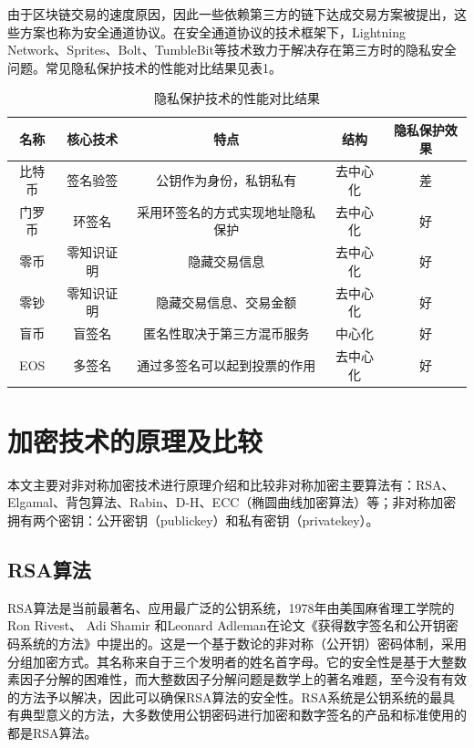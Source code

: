 \documentclass[UTF8,a4paper,10pt, twocolumn]{ctexart}
\begin{document}
由于区块链交易的速度原因，因此一些依赖第三方的链下达成交易方案被提出，这些方案也称为安全通道协议。在安全通道协议的技术框架下，Lightning Network、Sprites、Bolt、TumbleBit等技术致力于解决存在第三方时的隐私安全问题。常见隐私保护技术的性能对比结果见表1。

\begin{table}[hb]
	\caption{隐私保护技术的性能对比结果} \label{tab:table}
	\centering
	\addtolength{\tabcolsep}{-0mm} %
	\begin{tabular}{ccccc}
		\toprule[0.75pt]	%
		名称 & 核心技术 & 特点 & 结构 & 隐私保护效果 \\
		\midrule[0.5pt]	%
		比特币 & 签名验签 & 公钥作为身份，私钥私有 & 去中心化 & 差 \\  %
		门罗币 & 环签名 & 采用环签名的方式实现地址隐私保护 & 去中心化 & 好 \\
		零币 & 零知识证明 & 隐藏交易信息 & 去中心化 & 好 \\
		零钞 & 零知识证明 & 隐藏交易信息、交易金额 & 去中心化 & 好 \\
		盲币 & 盲签名 & 匿名性取决于第三方混币服务 & 中心化 & 好 \\
		EOS & 多签名 & 通过多签名可以起到投票的作用 & 去中心化 & 好 \\
		\bottomrule[0.75pt]	%
	\end{tabular}
\end{table}

\section{加密技术的原理及比较} \label{sec:two}
本文主要对非对称加密技术进行原理介绍和比较非对称加密主要算法有：RSA、Elgamal、背包算法、Rabin、D-H、ECC（椭圆曲线加密算法）等；非对称加密拥有两个密钥：公开密钥（publickey）和私有密钥（privatekey）。
\subsection{RSA算法}
RSA算法是当前最著名、应用最广泛的公钥系统，1978年由美国麻省理工学院的Ron Rivest、 Adi Shamir 和Leonard Adleman在论文《获得数字签名和公开钥密码系统的方法》中提出的。这是一个基于数论的非对称（公开钥）密码体制，采用分组加密方式。其名称来自于三个发明者的姓名首字母。它的安全性是基于大整数素因子分解的困难性，而大整数因子分解问题是数学上的著名难题，至今没有有效的方法予以解决，因此可以确保RSA算法的安全性。RSA系统是公钥系统的最具有典型意义的方法，大多数使用公钥密码进行加密和数字签名的产品和标准使用的都是RSA算法。
\end{document}
